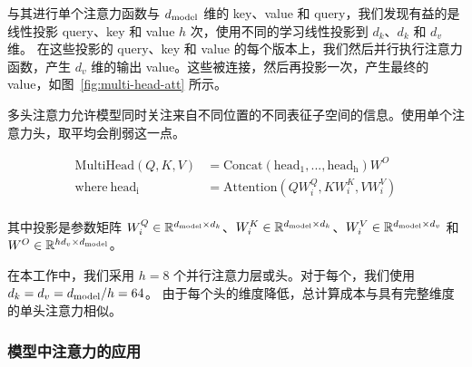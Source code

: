 与其进行单个注意力函数与 $d_{\text{model}}$ 维的 key、value 和 query，我们发现有益的是线性投影 query、key 和 value $h$ 次，使用不同的学习线性投影到 $d_k$、$d_k$ 和 $d_v$ 维。
在这些投影的 query、key 和 value 的每个版本上，我们然后并行执行注意力函数，产生 $d_v$ 维的输出 value。这些被连接，然后再投影一次，产生最终的 value，如图~\ref{fig:multi-head-att} 所示。

多头注意力允许模型同时关注来自不同位置的不同表征子空间的信息。使用单个注意力头，取平均会削弱这一点。

\begin{align*}
    \mathrm{MultiHead}(Q, K, V) &= \mathrm{Concat}(\mathrm{head_1}, ..., \mathrm{head_h})W^O\\
    \text{where}~\mathrm{head_i} &= \mathrm{Attention}(QW^Q_i, KW^K_i, VW^V_i)\\
\end{align*}

其中投影是参数矩阵 $W^Q_i \in \mathbb{R}^{d_{\text{model}} \times d_k}$、$W^K_i \in \mathbb{R}^{d_{\text{model}} \times d_k}$、$W^V_i \in \mathbb{R}^{d_{\text{model}} \times d_v}$ 和 $W^O \in \mathbb{R}^{hd_v \times d_{\text{model}}}$。



在本工作中，我们采用 $h=8$ 个并行注意力层或头。对于每个，我们使用 $d_k=d_v=d_{\text{model}}/h=64$。
由于每个头的维度降低，总计算成本与具有完整维度的单头注意力相似。

\subsubsection{模型中注意力的应用}


